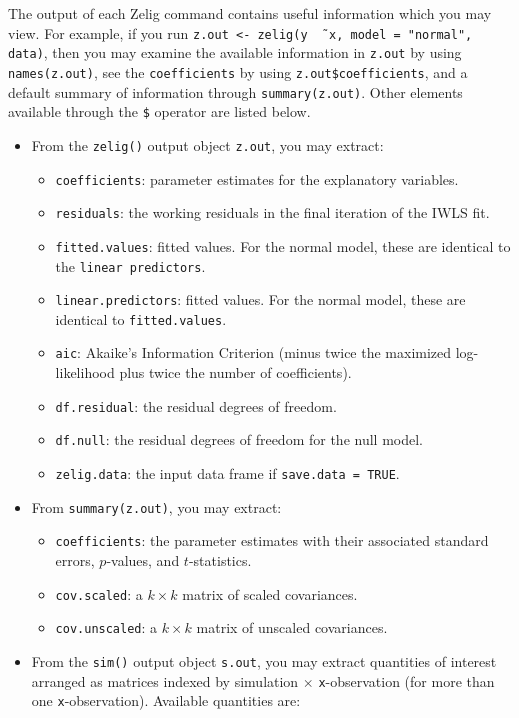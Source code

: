 The output of each Zelig command contains useful information which you
may view.  For example, if you run \texttt{z.out <- zelig(y \~\,
  x, model = "normal", data)}, then you may examine the available
information in \texttt{z.out} by using \texttt{names(z.out)},
see the {\tt coefficients} by using {\tt z.out\$coefficients}, and
a default summary of information through \texttt{summary(z.out)}.
Other elements available through the {\tt \$} operator are listed
below.

\begin{itemize}
\item From the {\tt zelig()} output object {\tt z.out}, you may extract:
   \begin{itemize}
   \item {\tt coefficients}: parameter estimates for the explanatory
     variables.
   \item {\tt residuals}: the working residuals in the final iteration
     of the IWLS fit.
   \item {\tt fitted.values}: fitted values.  For the normal model,
     these are identical to the {\tt linear predictors}.
   \item {\tt linear.predictors}: fitted values.  For the normal
     model, these are identical to {\tt fitted.values}.
   \item {\tt aic}: Akaike's Information Criterion (minus twice the
     maximized log-likelihood plus twice the number of coefficients).
   \item {\tt df.residual}: the residual degrees of freedom.
   \item {\tt df.null}: the residual degrees of freedom for the null
     model.
   \item {\tt zelig.data}: the input data frame if {\tt save.data = TRUE}.  
   \end{itemize}

\item From {\tt summary(z.out)}, you may extract: 
   \begin{itemize}
   \item {\tt coefficients}: the parameter estimates with their
     associated standard errors, $p$-values, and $t$-statistics.
   \item{\tt cov.scaled}: a $k \times k$ matrix of scaled covariances.
   \item{\tt cov.unscaled}: a $k \times k$ matrix of unscaled
     covariances.  
   \end{itemize}

\item From the {\tt sim()} output object {\tt s.out}, you may extract
  quantities of interest arranged as matrices indexed by simulation
  $\times$ {\tt x}-observation (for more than one {\tt x}-observation).
  Available quantities are:


\end{itemize}
